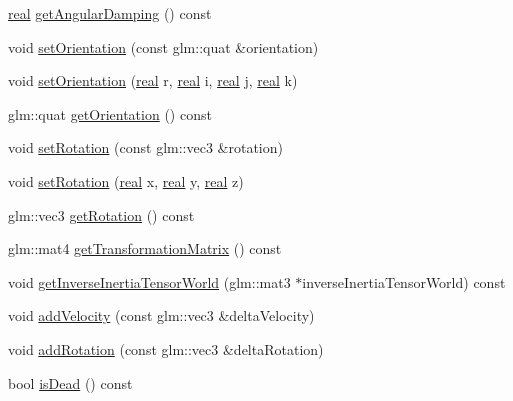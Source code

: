 \begin{DoxyCompactItemize}
\item 
\mbox{\hyperlink{namespacerum_a7e8cca23573d5eaead0f138cbaa4862c}{real}} \mbox{\hyperlink{classrum_1_1_rigid_body_a13f45609fd48d44695190a4bd81f2ad7}{get\+Angular\+Damping}} () const
\item 
void \mbox{\hyperlink{classrum_1_1_rigid_body_a2f4565f3884f4870403a2f6000860a81}{set\+Orientation}} (const glm\+::quat \&orientation)
\item 
void \mbox{\hyperlink{classrum_1_1_rigid_body_a86cae542fe9bde0f917bf8886b8cbb15}{set\+Orientation}} (\mbox{\hyperlink{namespacerum_a7e8cca23573d5eaead0f138cbaa4862c}{real}} r, \mbox{\hyperlink{namespacerum_a7e8cca23573d5eaead0f138cbaa4862c}{real}} i, \mbox{\hyperlink{namespacerum_a7e8cca23573d5eaead0f138cbaa4862c}{real}} j, \mbox{\hyperlink{namespacerum_a7e8cca23573d5eaead0f138cbaa4862c}{real}} k)
\item 
glm\+::quat \mbox{\hyperlink{classrum_1_1_rigid_body_a333d4b85e26497a8939faa1d0048d131}{get\+Orientation}} () const
\item 
void \mbox{\hyperlink{classrum_1_1_rigid_body_aa6b6e73db8fefb0a54d82cf245b6bda6}{set\+Rotation}} (const glm\+::vec3 \&rotation)
\item 
void \mbox{\hyperlink{classrum_1_1_rigid_body_a354acdf9002bcce27ed7d8d51469a06c}{set\+Rotation}} (\mbox{\hyperlink{namespacerum_a7e8cca23573d5eaead0f138cbaa4862c}{real}} x, \mbox{\hyperlink{namespacerum_a7e8cca23573d5eaead0f138cbaa4862c}{real}} y, \mbox{\hyperlink{namespacerum_a7e8cca23573d5eaead0f138cbaa4862c}{real}} z)
\item 
glm\+::vec3 \mbox{\hyperlink{classrum_1_1_rigid_body_aa99998dba8c818290cfba8dacccd66a2}{get\+Rotation}} () const
\item 
glm\+::mat4 \mbox{\hyperlink{classrum_1_1_rigid_body_a5e289b46c1849f186295d7f3cdef113d}{get\+Transformation\+Matrix}} () const
\item 
void \mbox{\hyperlink{classrum_1_1_rigid_body_a1bef6c65c76a64c0a7ea8ebff4cd5c58}{get\+Inverse\+Inertia\+Tensor\+World}} (glm\+::mat3 $\ast$inverse\+Inertia\+Tensor\+World) const
\item 
void \mbox{\hyperlink{classrum_1_1_rigid_body_a347acf72fd3aa739218025050713948a}{add\+Velocity}} (const glm\+::vec3 \&delta\+Velocity)
\item 
void \mbox{\hyperlink{classrum_1_1_rigid_body_a8d3625960b75bdf71c205274896d1969}{add\+Rotation}} (const glm\+::vec3 \&delta\+Rotation)
\item 
bool \mbox{\hyperlink{classrum_1_1_rigid_body_a7ee754f4781cc54404e23ef6095d405b}{is\+Dead}} () const

\end{DoxyCompactItemize}
